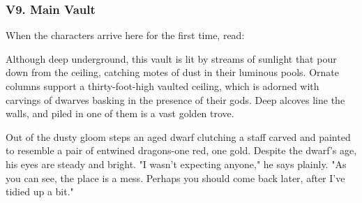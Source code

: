 \documentclass[10pt,a4paper,twoside,twocolumn,openany,nodeprecatedcode]{dndbook}
\begin{document}
\subsubsection{V9. Main Vault}
When the characters arrive here for the first time, read:
\begin{DndReadAloud}{}
Although deep underground, this vault is lit by streams of sunlight that pour down from the ceiling, catching motes of dust in their luminous pools. Ornate columns support a thirty-foot-high vaulted ceiling, which is adorned with carvings of dwarves basking in the presence of their gods. Deep alcoves line the walls, and piled in one of them is a vast golden trove.

Out of the dusty gloom steps an aged dwarf clutching a staff carved and painted to resemble a pair of entwined dragons-one red, one gold. Despite the dwarf's age, his eyes are steady and bright. "I wasn't expecting anyone," he says plainly. "As you can see, the place is a mess. Perhaps you should come back later, after I've tidied up a bit."
\end{DndReadAloud}
\end{document}

